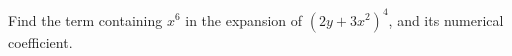 Find the term containing $x^6$ in the expansion of $\left(2y+3x^2\right)^4$, and its numerical coefficient.
